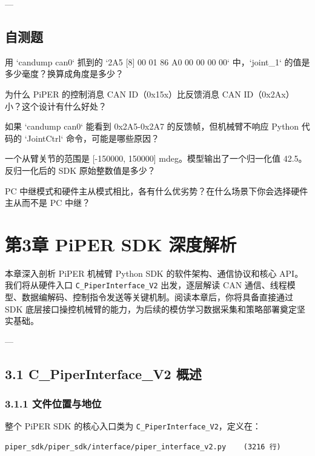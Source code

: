 \documentclass[UTF8,a4paper,11pt]{ctexart}
\begin{document}
---

\subsection{自测题}

\item[1] 用 `candump can0` 抓到的 `2A5 [8] 00 01 86 A0 00 00 00 00` 中，`joint_1` 的值是多少毫度？换算成角度是多少？
\item[2] 为什么 PiPER 的控制消息 CAN ID（0x15x）比反馈消息 CAN ID（0x2Ax）小？这个设计有什么好处？
\item[3] 如果 `candump can0` 能看到 0x2A5-0x2A7 的反馈帧，但机械臂不响应 Python 代码的 `JointCtrl` 命令，可能是哪些原因？
\item[4] 一个从臂关节的范围是 [-150000, 150000] mdeg。模型输出了一个归一化值 42.5。反归一化后的 SDK 原始整数值是多少？
\item[5] PC 中继模式和硬件主从模式相比，各有什么优劣势？在什么场景下你会选择硬件主从而不是 PC 中继？

\endgroup
\newpage

\begingroup
\section{第3章 PiPER SDK 深度解析}

本章深入剖析 PiPER 机械臂 Python SDK 的软件架构、通信协议和核心 API。我们将从硬件入口 \texttt{C_PiperInterface_V2} 出发，逐层解读 CAN 通信、线程模型、数据编解码、控制指令发送等关键机制。阅读本章后，你将具备直接通过 SDK 底层接口操控机械臂的能力，为后续的模仿学习数据采集和策略部署奠定坚实基础。

---

\subsection{3.1 C_PiperInterface_V2 概述}

\subsubsection{3.1.1 文件位置与地位}

整个 PiPER SDK 的核心入口类为 \texttt{C_PiperInterface_V2}，定义在：

\begin{lstlisting}[language=text]
piper_sdk/piper_sdk/interface/piper_interface_v2.py    (3216 行)
\end{lstlisting}
\end{document}
